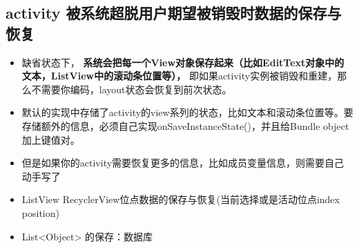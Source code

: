\documentclass[9pt, b5paper]{article}
\begin{document}
\subsection{activity 被系统超脱用户期望被销毁时数据的保存与恢复}
\label{sec-14-1}
\begin{itemize}
\item 缺省状态下， \textbf{系统会把每一个View对象保存起来（比如EditText对象中的文本，ListView中的滚动条位置等），} 即如果activity实例被销毁和重建，那么不需要你编码，layout状态会恢复到前次状态。
\item 默认的实现中存储了activity的view系列的状态，比如文本和滚动条位置等。要存储额外的信息，必须自己实现onSaveInstanceState()，并且给Bundle object加上键值对。
\item 但是如果你的activity需要恢复更多的信息，比如成员变量信息，则需要自己动手写了
\item ListView RecyclerView位点数据的保存与恢复(当前选择或是活动位点index position)
\item List<Object> 的保存：数据库
\end{itemize}
\end{document}
